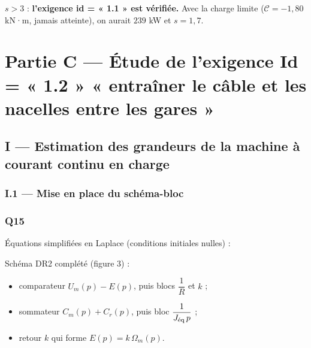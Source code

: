 \documentclass[11pt,a4paper]{article}
\providecommand{\tightlist}{\setlength{\itemsep}{0pt}\setlength{\parskip}{0pt}}
\newcommand{\equationajustee}[1]{%
  \sbox{\boiteequation}{$\displaystyle #1$}%
  \ifdim\wd\boiteequation>\linewidth
    \[\resizebox{\linewidth}{!}{\usebox{\boiteequation}}\]%
  \else
    \[#1\]%
  \fi}
\begin{document}
\(s>3\) : \textbf{l'exigence id = « 1.1 » est vérifiée.} Avec la charge limite (\(\mathcal C=-1{,}80\) kN·m, jamais atteinte), on aurait \(239\) kW et \(s=1{,}7\).

\hypertarget{partie-c-uxe9tude-de-lexigence-id-1.2-entrauxeener-le-cuxe2ble-et-les-nacelles-entre-les-gares}{%
\section{Partie C --- Étude de l'exigence Id = « 1.2 » « entraîner le câble et les nacelles entre les gares »}\label{partie-c-uxe9tude-de-lexigence-id-1.2-entrauxeener-le-cuxe2ble-et-les-nacelles-entre-les-gares}}

\hypertarget{i-estimation-des-grandeurs-de-la-machine-uxe0-courant-continu-en-charge}{%
\subsection{I --- Estimation des grandeurs de la machine à courant continu en charge}\label{i-estimation-des-grandeurs-de-la-machine-uxe0-courant-continu-en-charge}}

\hypertarget{i.1-mise-en-place-du-schuxe9ma-bloc}{%
\subsubsection{I.1 --- Mise en place du schéma-bloc}\label{i.1-mise-en-place-du-schuxe9ma-bloc}}

\hypertarget{q15}{%
\subsubsection{Q15}\label{q15}}

Équations simplifiées en Laplace (conditions initiales nulles) :

\equationajustee{\begin{aligned}
U_m&=R\,I+E\\
J_{\text{\text{éq}}}\,p\,\Omega_m&=C_m+C_r\\
E&=k\,\Omega_m\\
C_m&=k\,I
\end{aligned}}

Schéma DR2 complété (figure 3) :

\begin{itemize}
\tightlist
\item
  comparateur \(U_m(p)-E(p)\), puis blocs \(\dfrac1R\) et \(k\) ;
\item
  sommateur \(C_m(p)+C_r(p)\), puis bloc \(\dfrac1{J_{\text{\text{éq}}}\,p}\) ;
\item
  retour \(k\) qui forme \(E(p)=k\,\Omega_m(p)\).
\end{itemize}
\end{document}
